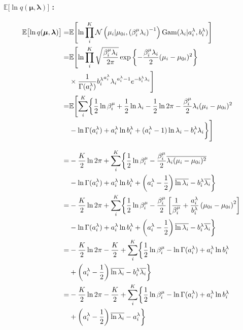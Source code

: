 \paragraph{$\mathbb{E}\bigl[\ln q({\boldsymbol \mu}, {\boldsymbol \lambda}) \bigr]$ : }
\begin{align}
  \mathbb{E}\bigl[\ln q({\boldsymbol \mu}, {\boldsymbol \lambda}) \bigr]  =&  
    \mathbb{E}\Biggl[ \ln \prod_i^K  \mathcal{N}\left(\mu_i | \mu_{0i}, \left( \beta_i^\mu \lambda_i \right)^{-1}\right) {\rm Gam}(\lambda_i | a_i^\lambda, b_i^\lambda)  \Biggr]  \\
%
    =&  \mathbb{E}\Biggl[ \ln \prod_i^K \sqrt{ \frac{ \beta_i^\mu \lambda_i }{ 2 \pi }} \exp\left\{ - \frac{\beta_i^\mu \lambda_i}{2} (\mu_i - \mu_{0i})^2 \right\}  \notag  \\  
      &  \times \frac{ 1 }{ \Gamma(a_i^\lambda) } {b_i^\lambda}^{a_i^\lambda} {\lambda_i}^{a_i^\lambda - 1} e^{-b_i^\lambda \lambda_i} \Biggr]  \\
%
  =&  \mathbb{E}\Biggl[ \sum_i^K \biggl\{  
      \frac{1}{2} \ln \beta_i^\mu + \frac{1}{2} \ln \lambda_i - \frac{1}{2} \ln 2 \pi - \frac{\beta_i^\mu}{2} \lambda_i (\mu_i - \mu_{0i})^2  \notag  \\
      &  - \ln \Gamma(a_i^\lambda) + a_i^\lambda \ln b_i^\lambda + (a_i^\lambda - 1) \ln \lambda_i - b_i^\lambda \lambda_i  
    \biggr\} \Biggr]  \\
%
\intertext{}
%
  =&  - \frac{K}{2} \ln 2 \pi + \sum_i^K \biggl\{  
      \frac{1}{2} \ln \beta_i^\mu - \frac{\beta_i^\mu}{2} \overline{\lambda_i (\mu_i - \mu_{0i})^2}  \notag  \\
      &  - \ln \Gamma(a_i^\lambda) + a_i^\lambda \ln b_i^\lambda + \left( a_i^\lambda - \frac{1}{2} \right) \overline{\ln \lambda_i} - b_i^\lambda \overline{\lambda_i}  
    \biggr\}  \\
%
  =&  - \frac{K}{2} \ln 2 \pi + \sum_i^K \biggl\{  
      \frac{1}{2} \ln \beta_i^\mu - \frac{\beta_i^\mu}{2} \left[ \frac{1}{\beta_i^\mu} + \frac{a_i^\lambda}{b_i^\lambda} \left( \mu_{0i} - \mu_{0i} \right)^2 \right]  \notag  \\
      &  - \ln \Gamma(a_i^\lambda) + a_i^\lambda \ln b_i^\lambda + \left( a_i^\lambda - \frac{1}{2} \right) \overline{\ln \lambda_i} - b_i^\lambda \overline{\lambda_i}  
    \biggr\}  \\
%
  =&  - \frac{K}{2} \ln 2 \pi - \frac{K}{2} + \sum_i^K \biggl\{  
      \frac{1}{2} \ln \beta_i^\mu  
        - \ln \Gamma(a_i^\lambda) + a_i^\lambda \ln b_i^\lambda  \notag  \\  
    &  + \left( a_i^\lambda - \frac{1}{2} \right) \overline{\ln \lambda_i} - b_i^\lambda \overline{\lambda_i}  
    \biggr\}  \\
%
  =&  - \frac{K}{2} \ln 2 \pi - \frac{K}{2} + \sum_i^K \biggl\{  
      \frac{1}{2} \ln \beta_i^\mu  
        - \ln \Gamma(a_i^\lambda) + a_i^\lambda \ln b_i^\lambda  \notag  \\  
    &  + \left( a_i^\lambda - \frac{1}{2} \right) \overline{\ln \lambda_i} - a_i^\lambda  
    \biggr\}  
\end{align}


